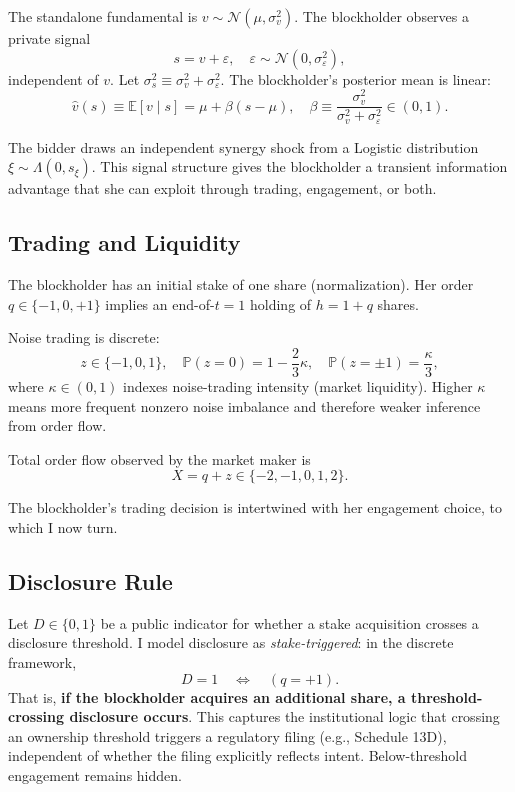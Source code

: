 \documentclass[11pt]{article}
\newcommand{\E}{\mathbb{E}}
\newcommand{\PP}{\mathbb{P}}
\newcommand{\1}{\mathbf{1}}
\begin{document}
The standalone fundamental is $v \sim \mathcal{N}(\mu, \sigma_v^2)$. The blockholder observes a private signal
\[
s = v + \varepsilon, \quad \varepsilon \sim \mathcal{N}(0, \sigma_\varepsilon^2),
\]
independent of $v$. Let $\sigma_s^2 \equiv \sigma_v^2 + \sigma_\varepsilon^2$. The blockholder's posterior mean is linear:
\[
\hat{v}(s) \equiv \E[v \mid s] = \mu + \beta(s - \mu), \quad \beta \equiv \frac{\sigma_v^2}{\sigma_v^2 + \sigma_\varepsilon^2} \in (0,1).
\]

The bidder draws an independent synergy shock from a Logistic distribution $\xi \sim \Lambda(0, s_\xi)$. This signal structure gives the blockholder a transient information advantage that she can exploit through trading, engagement, or both.

%
\subsection{Trading and Liquidity}
%

The blockholder has an initial stake of one share (normalization). Her order $q \in \{-1, 0, +1\}$ implies an end-of-$t=1$ holding of $h = 1 + q$ shares.

Noise trading is discrete:
\[
z \in \{-1, 0, 1\}, \quad \PP(z = 0) = 1 - \frac{2}{3}\kappa, \quad \PP(z = \pm 1) = \frac{\kappa}{3},
\]
where $\kappa \in (0, 1)$ indexes noise-trading intensity (market liquidity). Higher $\kappa$ means more frequent nonzero noise imbalance and therefore weaker inference from order flow.

Total order flow observed by the market maker is
\[
X = q + z \in \{-2, -1, 0, 1, 2\}.
\]

The blockholder's trading decision is intertwined with her engagement choice, to which I now turn.

%
\subsection{Disclosure Rule}
%

Let $D \in \{0, 1\}$ be a public indicator for whether a stake acquisition crosses a disclosure threshold. I model disclosure as \emph{stake-triggered}: in the discrete framework,
\[
D = 1 \quad \Longleftrightarrow \quad (q = +1).
\]
That is, \textbf{if the blockholder acquires an additional share, a threshold-crossing disclosure occurs}. This captures the institutional logic that crossing an ownership threshold triggers a regulatory filing (e.g., Schedule 13D), independent of whether the filing explicitly reflects intent. Below-threshold engagement remains hidden.
\end{document}

